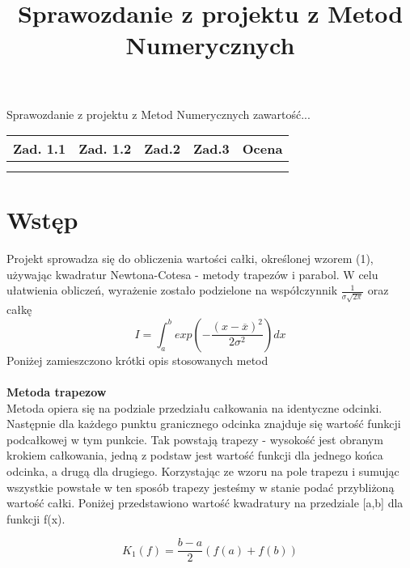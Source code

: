 \documentclass{article}
\title{Sprawozdanie z projektu z Metod Numerycznych}
\begin{document}
		\maketitle	
	\pagestyle{fancy}

	
	Sprawozdanie z projektu z Metod Numerycznych
	zawartość...\\
	\begin{center}
		
		\begin{tabular}{|c|c|c|c|c|}
			\hline
			Zad. 1.1 & Zad. 1.2 &  Zad.2 & Zad.3 & Ocena\\\hline
			 & & & & \\
			 & & & & \\\hline
		\end{tabular}

	\end{center}
	\section{Wstęp}
	Projekt sprowadza się do obliczenia wartości całki, określonej wzorem (1), używając kwadratur Newtona-Cotesa - metody trapezów i parabol. W celu ułatwienia obliczeń, wyrażenie zostało podzielone na współczynnik $\frac{1}{\sigma\sqrt{2\pi}}$ oraz całkę
		\begin{equation}
			I = \int_{a}^{b} exp  \left( - \frac{(x-\overline{x})^2}{2\sigma^2}   \right) dx
		\end{equation}
	Poniżej zamieszczono krótki opis stosowanych metod
	\\\\
	\textbf {Metoda trapezow }
	\\ 
	Metoda opiera się na podziale przedziału całkowania na identyczne odcinki. Następnie dla każdego punktu granicznego odcinka znajduje się wartość funkcji podcałkowej w tym punkcie. Tak powstają trapezy - wysokość jest obranym krokiem całkowania, jedną z podstaw jest wartość funkcji dla jednego końca odcinka, a drugą dla drugiego. Korzystając ze wzoru na pole trapezu i sumując wszystkie powstałe w ten sposób trapezy jesteśmy w stanie podać przybliżoną wartość całki. Poniżej przedstawiono wartość kwadratury na przedziale [a,b] dla funkcji f(x).
	
	\begin{equation}	
	K_{1}(f)=\frac{b-a}{2}(f(a)+f(b))  
	\end{equation}
	
\end{document}
